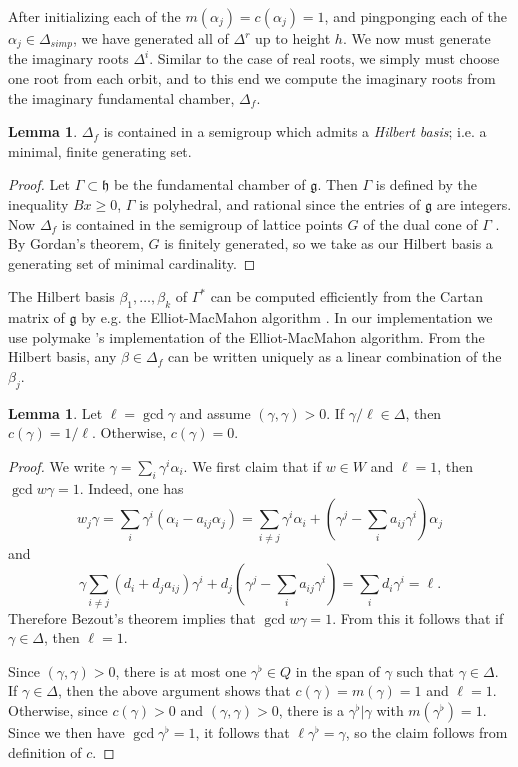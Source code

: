 \documentclass[12pt]{article}
\newcommand{\g}{\mathfrak g}
\newcommand{\h}{\mathfrak h}
\newcommand{\dfn}[1]{\emph{#1}\index{#1}}
\theoremstyle{definition}
\newtheorem{lemma}[theorem]{Lemma}
\begin{document}
After initializing each of the $m(\alpha_j) = c(\alpha_j) = 1$, and pingponging each of the $\alpha_j \in \Delta_{simp}$, we have generated all of $\Delta^r$ up to height $h$. We now must generate the imaginary roots $\Delta^i$. Similar to the case of real roots, we simply must choose one root from each orbit, and to this end we compute the imaginary roots from the imaginary fundamental chamber, $\Delta_f$.

\begin{lemma}
    \label{hilbert basis exists}
	$\Delta_f$ is contained in a semigroup which admits a \dfn{Hilbert basis}; i.e. a minimal, finite generating set.
\end{lemma}
\begin{proof}
	Let $\Gamma \subset \h$ be the fundamental chamber of $\g$. Then $\Gamma$ is defined by the inequality $Bx \geq 0$, $\Gamma$ is polyhedral, and rational since the entries of $\g$ are integers. Now $\Delta_f$ is contained in the semigroup of lattice points $G$ of the dual cone of $\Gamma$ \cite[\S 5.8]{kac_2014}. By Gordan's theorem, $G$ is finitely generated, so we take as our Hilbert basis a generating set of minimal cardinality.
\end{proof}

The Hilbert basis $\beta_1, \dots, \beta_k$ of $\Gamma^*$ can be computed efficiently from the Cartan matrix of $\g$ by e.g. the Elliot-MacMahon algorithm \cite{pasechnik2001computing}. In our implementation we use polymake \cite{polymake2000}'s implementation of the Elliot-MacMahon algorithm. From the Hilbert basis, any $\beta \in \Delta_f$ can be written uniquely as a linear combination of the $\beta_j$.

\begin{lemma}
    \label{real lemma}
	Let $\ell = \gcd \gamma$ and assume $(\gamma, \gamma) > 0$. If $\gamma/\ell \in \Delta$, then $c(\gamma) = 1/\ell$. Otherwise, $c(\gamma) = 0$.
\end{lemma}
\begin{proof}
	We write $\gamma = \sum_i \gamma^i \alpha_i$. We first claim that if $w \in W$ and $\ell = 1$, then $\gcd w\gamma = 1$. Indeed, one has
	$$w_j\gamma = \sum_i \gamma^i (\alpha_i - a_{ij} \alpha_j) = \sum_{i \neq j} \gamma^i \alpha_i + (\gamma^j - \sum_i a_{ij} \gamma^i) \alpha_j$$
	and
	$$\gamma \sum_{i\neq j} (d_i + d_j a_{ij}) \gamma^i + d_j \left(\gamma^j - \sum_i a_{ij} \gamma^i\right) = \sum_i d_i \gamma^i = \ell.$$
	Therefore Bezout's theorem implies that $\gcd w\gamma = 1$. From this it follows that if $\gamma \in \Delta$, then $\ell = 1$.

	Since $(\gamma, \gamma) > 0$, there is at most one $\gamma^\flat \in Q$ in the span of $\gamma$ such that $\gamma \in \Delta$. If $\gamma \in \Delta$, then the above argument shows that $c(\gamma) = m(\gamma) = 1$ and $\ell = 1$. Otherwise, since $c(\gamma) > 0$ and $(\gamma, \gamma) > 0$, there is a $\gamma^\flat|\gamma$ with $m(\gamma^\flat) = 1$. Since we then have $\gcd \gamma^\flat = 1$, it follows that $\ell \gamma^\flat = \gamma$, so the claim follows from definition of $c$.
\end{proof}
\end{document}
